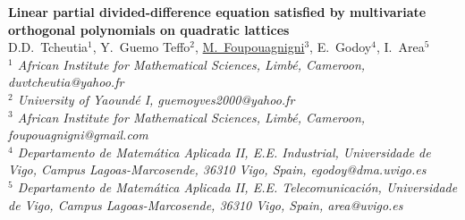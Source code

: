 \documentclass[11pt]{article}
\begin{document}
%
\vspace{-0.8cm}
\begin{flushleft}
\Large \textbf{\noindent
Linear partial divided-difference equation satisfied by multivariate orthogonal polynomials on quadratic lattices}
\\
\vspace{0.5cm}
\normalsize
\normalsize{
 D.D.~Tcheutia$^1$, Y.~Guemo  Teffo$^2$,  \underline{M.~Foupouagnigni}$^3$,  E.~Godoy$^4$,  I.~Area$^5$
} \\
\vspace{5mm}
\textit{\footnotesize
$^1$ African Institute for Mathematical Sciences, Limb\'{e}, Cameroon,
duvtcheutia@yahoo.fr\\
$^2$ University of Yaound\'{e} I,
guemoyves2000@yahoo.fr\\
$^3$ African Institute for Mathematical Sciences, Limb\'{e}, Cameroon,
foupouagnigni@gmail.com\\
$^4$ Departamento de Matem\'atica Aplicada II,  E.E. Industrial, Universidade de Vigo, Campus Lagoas-Marcosende,   36310 Vigo, Spain,
egodoy@dma.uvigo.es\\
$^5$ Departamento de Matem\'atica Aplicada II, E.E. Telecomunicaci\'on, Universidade de Vigo, Campus Lagoas-Marcosende, 36310 Vigo, Spain,
area@uvigo.es\\
}
\end{flushleft}
\end{document}
